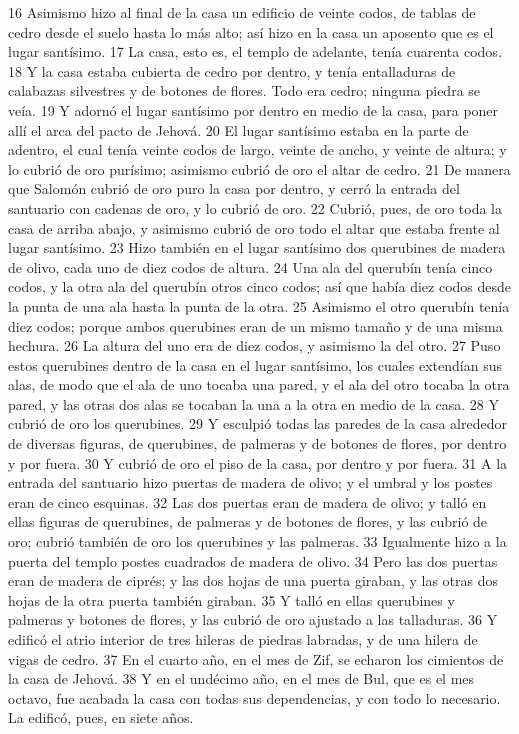16 Asimismo hizo al final de la casa un edificio de veinte codos,  de tablas de cedro desde el suelo hasta lo más alto; así hizo en la casa un aposento que es el lugar santísimo. 
17 La casa, esto es, el templo de adelante, tenía cuarenta codos.
18 Y la casa estaba cubierta de cedro por dentro, y tenía entalladuras de calabazas silvestres y de botones de flores. Todo era cedro; ninguna piedra se veía.
19 Y adornó el lugar santísimo por dentro en medio de la casa, para poner allí el arca del pacto de Jehová.
20 El lugar santísimo estaba en la parte de adentro, el cual tenía veinte codos   de largo, veinte de ancho, y veinte de altura; y lo cubrió de oro purísimo; asimismo cubrió de oro el altar de cedro.
21 De manera que Salomón cubrió de oro puro la casa por dentro, y cerró la entrada del santuario con cadenas de oro, y lo cubrió de oro.
22 Cubrió, pues, de oro toda la casa de arriba abajo, y asimismo cubrió de oro todo el altar que estaba frente al lugar santísimo. 
23 Hizo también en el lugar santísimo dos querubines de madera de olivo, cada uno de diez codos de altura.
24 Una ala del querubín tenía cinco codos,  y la otra ala del querubín otros cinco codos; así que había diez codos desde la punta de una ala hasta la punta de la otra.
25 Asimismo el otro querubín tenía diez codos;  porque ambos querubines eran de un mismo tamaño y de una misma hechura.
26 La altura del uno era de diez codos,  y asimismo la del otro.
27 Puso estos querubines dentro de la casa en el lugar santísimo, los cuales extendían sus alas, de modo que el ala de uno tocaba una pared, y el ala del otro tocaba la otra pared, y las otras dos alas se tocaban la una a la otra en medio de la casa.
28 Y cubrió de oro los querubines.
29 Y esculpió todas las paredes de la casa alrededor de diversas figuras, de querubines, de palmeras y de botones de flores, por dentro y por fuera.
30 Y cubrió de oro el piso de la casa, por dentro y por fuera.
31 A la entrada del santuario hizo puertas de madera de olivo; y el umbral y los postes eran de cinco esquinas.
32 Las dos puertas eran de madera de olivo; y talló en ellas figuras de querubines, de palmeras y de botones de flores, y las cubrió de oro; cubrió también de oro los querubines y las palmeras.
33 Igualmente hizo a la puerta del templo postes cuadrados de madera de olivo.
34 Pero las dos puertas eran de madera de ciprés; y las dos hojas de una puerta giraban, y las otras dos hojas de la otra puerta también giraban.
35 Y talló en ellas querubines y palmeras y botones de flores, y las cubrió de oro ajustado a las talladuras.
36 Y edificó el atrio interior de tres hileras de piedras labradas, y de una hilera de vigas de cedro.
37 En el cuarto año, en el mes de Zif, se echaron los cimientos de la casa de Jehová.
38 Y en el undécimo año, en el mes de Bul, que es el mes octavo, fue acabada la casa con todas sus dependencias, y con todo lo necesario. La edificó, pues, en siete años.

